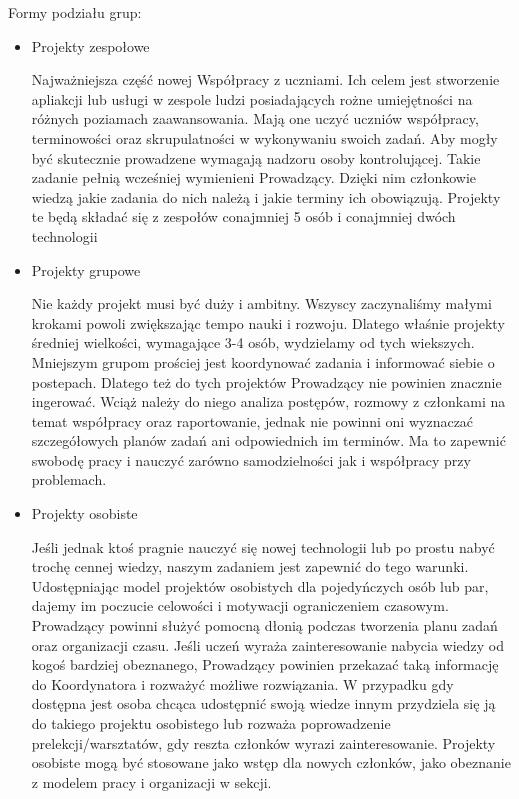 \documentclass[9pt,a4paper]{report}
\begin{document}
Formy podziału grup:
\begin{itemize}
\item Projekty zespołowe

Najważniejsza część nowej Współpracy z uczniami. Ich celem jest stworzenie apliakcji lub usługi w zespole ludzi posiadających rożne umiejętności na różnych poziamach zaawansowania. Mają one uczyć uczniów współpracy, terminowości oraz skrupulatności w wykonywaniu swoich zadań. Aby mogły być skutecznie prowadzene wymagają nadzoru osoby kontrolującej. Takie zadanie pełnią wcześniej wymienieni Prowadzący. Dzięki nim członkowie wiedzą jakie zadania do nich należą i jakie terminy ich obowiązują. Projekty te będą składać się z zespołów conajmniej 5 osób i conajmniej dwóch technologii\\
\item Projekty grupowe

Nie każdy projekt musi być duży i ambitny. Wszyscy zaczynaliśmy małymi krokami powoli zwiększając tempo nauki i rozwoju. Dlatego właśnie projekty średniej wielkości, wymagające 3-4 osób, wydzielamy od tych wiekszych. Mniejszym grupom prościej jest koordynować zadania i informować siebie o postepach. Dlatego też do tych projektów Prowadzący nie powinien znacznie ingerować. Wciąż należy do niego analiza postępów, rozmowy z członkami na temat współpracy oraz raportowanie, jednak nie powinni oni wyznaczać szczegółowych planów zadań ani odpowiednich im terminów. Ma to zapewnić swobodę pracy i nauczyć zarówno samodzielności jak i współpracy przy problemach.
\item Projekty osobiste

Jeśli jednak ktoś pragnie nauczyć się nowej technologii lub po prostu nabyć trochę cennej wiedzy, naszym zadaniem jest zapewnić do tego warunki. Udostępniając model projektów osobistych dla pojedyńczych osób lub par, dajemy im poczucie celowości i motywacji ograniczeniem czasowym. Prowadzący powinni służyć pomocną dłonią podczas tworzenia planu zadań oraz organizacji czasu. Jeśli uczeń wyraża zainteresowanie nabycia wiedzy od kogoś bardziej obeznanego, Prowadzący powinien przekazać taką informację do Koordynatora i rozważyć możliwe rozwiązania. W przypadku gdy dostępna jest osoba chcąca udostępnić swoją wiedze innym przydziela się ją do takiego projektu osobistego lub rozważa poprowadzenie prelekcji/warsztatów, gdy reszta członków wyrazi zainteresowanie. Projekty osobiste mogą być stosowane jako wstęp dla nowych członków, jako obeznanie z modelem pracy i organizacji w sekcji.
\end{itemize}
\end{document}
